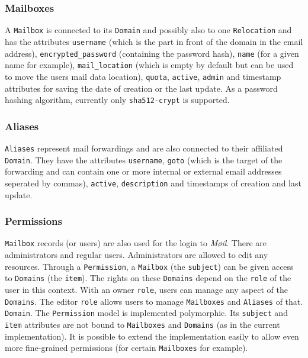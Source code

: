 \documentclass[12pt,a4paper]{scrartcl}
\begin{document}
			\subsubsection{Mailboxes}
				A \texttt{Mailbox} is connected to its \texttt{Domain} and
				possibly also to one \texttt{Relocation} and has the attributes
				\texttt{username} (which is the part in front of the
				domain in the email address), \texttt{encrypted\_password}
				(containing the password hash), \texttt{name} (for a given name
				for example), \texttt{mail\_location} (which is empty by
				default but can be used to move the users mail data location),
				\texttt{quota}, \texttt{active}, \texttt{admin} and timestamp
				attributes for saving the date of creation or the last update.
				As a password hashing algorithm, currently only
				\texttt{sha512-crypt} is supported.

			\subsubsection{Aliases}
				\texttt{Aliases} represent mail forwardings and are also
				connected to their affiliated \texttt{Domain}. They have the
				attributes \texttt{username}, \texttt{goto} (which is the
				target of the forwarding and can contain one or more internal
				or external email addresses seperated by commas),
				\texttt{active}, \texttt{description} and timestamps of
				creation and last update.

			\subsubsection{Permissions}
				\texttt{Mailbox} records (or users) are also used for the login
				to \emph{Møil}. There are administrators and regular users.
				Administrators are allowed to edit any resources. Through a
				\texttt{Permission}, a \texttt{Mailbox} (the \texttt{subject})
				can be given access to \texttt{Domains} (the \texttt{item}).
				The rights on these \texttt{Domains} depend on the
				\texttt{role} of the user in this context. With an owner
				\texttt{role}, users can manage any aspect of the
				\texttt{Domains}. The editor \texttt{role} allows users to
				manage \texttt{Mailboxes} and \texttt{Aliases} of that.
				\texttt{Domain}. The \texttt{Permission} model is implemented
				polymorphic. Its \texttt{subject} and \texttt{item} attributes
				are not bound to \texttt{Mailboxes} and \texttt{Domains} (as in
				the current implementation). It is possible to extend the
				implementation easily to allow even more fine-grained
				permissions (for certain \texttt{Mailboxes} for example).
\end{document}
